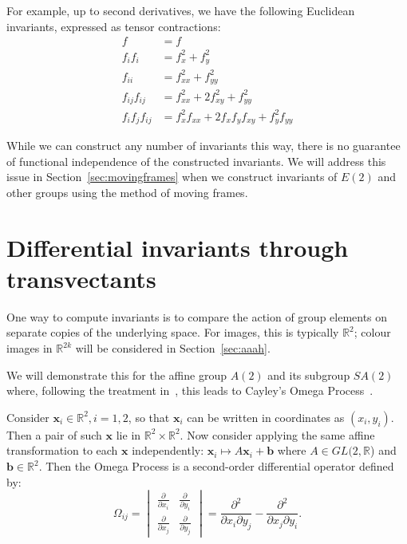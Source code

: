 \documentclass[review,onefignum,onetabnum]{siamonline190516}
\begin{document}
{For example, up to second derivatives, we have the following Euclidean invariants, expressed as tensor contractions:
\begin{align*}
  f &= f \\
  f_if_i &= f_x^2 + f_y^2 \\
  f_{ii} &= f_{xx}^2 + f_{yy}^2 \\
  f_{ij} f_{ij} &= f_{xx}^2 + 2f_{xy}^2 + f_{yy}^2 \\
  f_i f_j f_{ij} &= f_x^2 f_{xx} + 2f_x f_y f_{xy} + f_y^2 f_{yy}
\end{align*}

While we can construct any number of invariants this way, there is no guarantee of functional independence of the constructed invariants. We will address this issue in Section~\ref{sec:movingframes} when we construct invariants of $E(2)$ and other groups using the method of moving frames.


\section{Differential invariants through transvectants}

One way to compute invariants is to compare the action of group elements on separate copies of the underlying space. For images, this is typically $\mathbb{R}^2$; colour images in $\mathbb{R}^{2k}$ will be considered in Section~\ref{sec:aaah}. 

We will demonstrate this for the affine group $A(2)$ and its subgroup
$SA(2)$ where, following the treatment in~\cite{OlverCIT}, this leads to
Cayley's Omega Process~\cite{Cayley}. 

Consider $\mathbf{x}_i \in \mathbb{R}^2, i=1,2$, so that $\mathbf{x}_i$ can
be written in coordinates as $(x_i, y_i)$. Then a pair of such $\mathbf{x}$ lie in $\mathbb{R}^2 \times \mathbb{R}^2$. Now consider applying the same affine transformation to each $\mathbf{x}$ independently: $\mathbf{x}_i \mapsto A \mathbf{x}_i + \mathbf{b}$ where $A \in GL(2,\mathbb{R}$) and $\mathbf{b} \in \mathbb{R}^2$. Then the Omega Process is a second-order differential operator defined by: 
\begin{equation}
\Omega_{ij} = \begin{vmatrix} \frac{\partial}{\partial x_i} &
\frac{\partial}{\partial y_i} \\ \frac{\partial}{\partial x_j} &
\frac{\partial}{\partial y_j} \end{vmatrix} = 
\frac{\partial^2}{\partial x_i
\partial y_j} - \frac{\partial^2}{\partial x_j \partial y_i}.
\end{equation}

}
\end{document}
